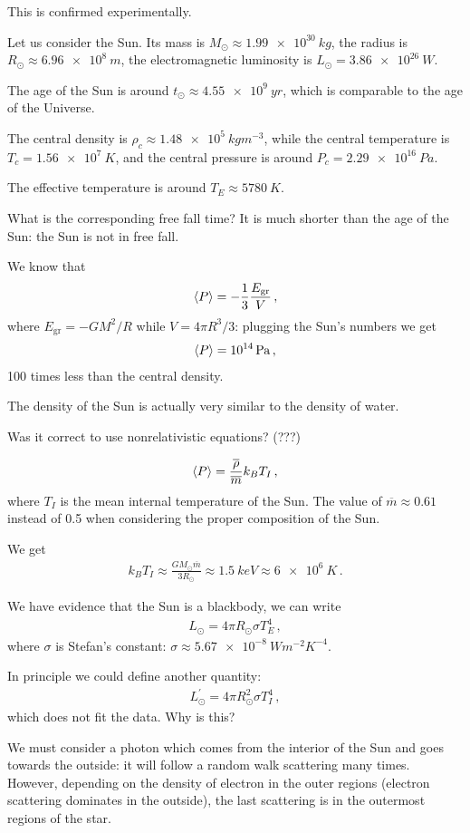 \documentclass[main.tex]{subfiles}
\begin{document}
This is confirmed experimentally. 

Let us consider the Sun. Its mass is \(M_{\odot} \approx \SI{1.99e30}{kg}\), the radius is \(R_{\odot} \approx \SI{6.96e8}{m}\), the electromagnetic luminosity is \(L_{\odot} = \SI{3.86e26}{W}\). 

The age of the Sun is around \(t_{\odot} \approx \SI{4.55e9}{yr}\), which is comparable to the age of the Universe. 

The central density is \(\rho _c \approx \SI{1.48e5}{kg m^{-3}}\), while the central temperature is \(T_c = \SI{1.56e7}{K}\), and the central pressure is around \(P_c = \SI{2.29e16}{Pa}\).  

The effective temperature is around \(T_E \approx \SI{5780}{K}\). 

What is the corresponding free fall time? It is much shorter than the age of the Sun: the Sun is not in free fall. 

We know that 
%
\begin{align}
  \expval{P} = -\frac{1}{3} \frac{E _{\text{gr}}}{V}
\,,
\end{align}
%
where \(E _{\text{gr}} = - G M^2/R\) while \(V = 4 \pi R^3/3\): plugging the Sun's numbers we get 
%
\begin{align}
  \expval{P} = \SI{e14}{Pa}
\,,
\end{align}
%
100 times less than the central density. 

The density of the Sun is actually very similar to the density of water. 

Was it correct to use nonrelativistic equations? (???)

%
\begin{align}
  \expval{P} = \frac{\overline{\rho}}{\overline{m}} k_B T_I
\,,
\end{align}
%
where \(T_I\) is the mean internal temperature of the Sun. 
The value of \(\overline{m} \approx 0.61\) instead of 0.5 when considering the proper composition of the Sun. 

We get 
%
\begin{align}
  k_B T_I \approx \frac{G M_{\odot} \overline{m}}{3 R_{\odot} } \approx \SI{1.5}{keV} \approx \SI{6e6}{K}
\,.
\end{align}

We have evidence that the Sun is a blackbody, we can write 
%
\begin{align}
  L_{\odot} = 4 \pi R_{\odot} \sigma T^{4}_{E}
\,,
\end{align}
%
where \(\sigma \) is Stefan's constant: \(\sigma \approx \SI{5.67e-8}{W m^{-2} K^{-4}}\). 

In principle we could define another quantity: 
%
\begin{align}
  L_{\odot}^{\prime } = 4 \pi R_{\odot}^2 \sigma T_I^4
\,,
\end{align}
%
which does not fit the data. Why is this? 

We must consider a photon which comes from the interior of the Sun and goes towards the outside: it will follow a random walk scattering many times. However, depending on the density of electron in the outer regions (electron scattering dominates in the outside), the last scattering is in the outermost regions of the star. 
\end{document}
